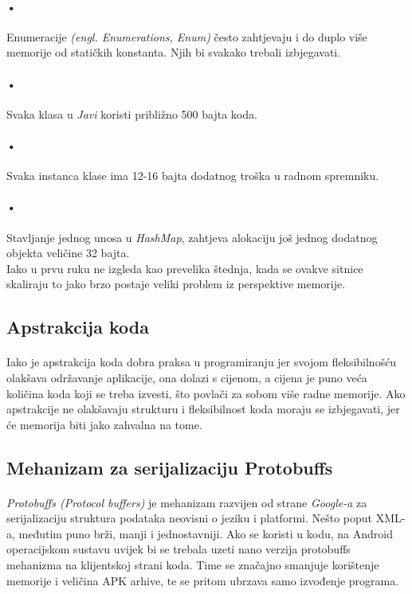 \documentclass[times, utf8, zavrsni]{fer}
\begin{document}
\paragraph{•}
Enumeracije \textit{(engl. Enumerations, Enum)} često zahtjevaju i do duplo više memorije od statičkih konstanta. Njih bi svakako trebali izbjegavati.

\paragraph{•}
Svaka klasa u \textit{Javi} koristi približno 500 bajta koda.

\paragraph{•}
Svaka instanca klase ima 12-16 bajta dodatnog troška u radnom spremniku.

\paragraph{•}
Stavljanje jednog unosa u \textit{HashMap}, zahtjeva alokaciju još jednog dodatnog objekta veličine 32 bajta.\\

Iako u prvu ruku ne izgleda kao prevelika štednja, kada se ovakve sitnice  skaliraju to jako brzo postaje veliki problem iz perspektive memorije.

\subsection{Apstrakcija koda}
\paragraph{}
Iako je apstrakcija koda dobra praksa u programiranju jer svojom fleksibilnošću olakšava održavanje aplikacije, ona dolazi s cijenom, a cijena je puno veća količina koda koji se treba izvesti, što povlači za sobom više radne memorije. Ako apstrakcije ne olakšavaju strukturu i fleksibilnost koda moraju se izbjegavati, jer će memorija biti jako zahvalna na tome.

\subsection{Mehanizam za serijalizaciju Protobuffs}
\paragraph{}
\textit{Protobuffs (Protocol buffers)} je mehanizam razvijen od strane \textit{Google-a} za serijalizaciju struktura podataka neovisni o jeziku i platformi. Nešto poput XML-a, međutim puno brži, manji i jednostavniji. Ako se koristi u kodu, na Android operacijskom sustavu uvijek bi se trebala uzeti nano verzija protobuffs mehanizma na klijentskoj strani koda. Time se značajno smanjuje korištenje memorije i veličina APK arhive, te se pritom ubrzava samo izvođenje programa.
\end{document}
